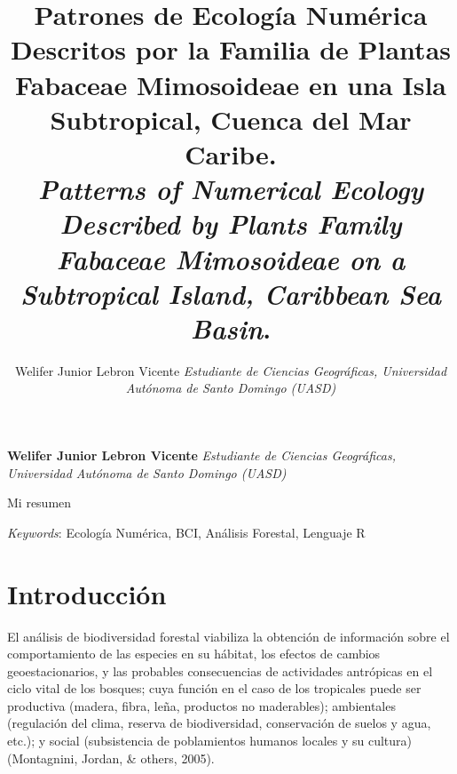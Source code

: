 \documentclass[11pt,]{article}
\title{Patrones de Ecología Numérica Descritos por la Familia de Plantas
Fabaceae Mimosoideae en una Isla Subtropical, Cuenca del Mar Caribe.\\
\emph{Patterns of Numerical Ecology Described by Plants Family Fabaceae
Mimosoideae on a Subtropical Island, Caribbean Sea Basin}.\\  }
\author{\Large Welifer Junior Lebron Vicente\vspace{0.05in} \newline\normalsize\emph{Estudiante de Ciencias Geográficas, Universidad Autónoma de Santo
Domingo (UASD)}  }
\date{}
\newcommand*{\authorfont}{\fontfamily{phv}\selectfont}
\renewenvironment{abstract}
 {{%
    \setlength{\leftmargin}{0mm}
    \setlength{\rightmargin}{\leftmargin}%
  }%
  \relax}
 {\endlist}
\begin{document}
	
%

{%
\setlength{\parindent}{0pt}
\thispagestyle{plain}
{\fontsize{18}{20}\selectfont\raggedright 
\maketitle  %

}

{
   \vskip 13.5pt\relax \normalsize\fontsize{11}{12} 
\textbf{\authorfont Welifer Junior Lebron Vicente} \hskip 15pt \emph{\small Estudiante de Ciencias Geográficas, Universidad Autónoma de Santo
Domingo (UASD)}   

}

}








\begin{abstract}

    \hbox{\vrule height .2pt width 39.14pc}

    \vskip 8.5pt %

\noindent Mi resumen


\vskip 8.5pt \noindent \emph{Keywords}: Ecología Numérica, BCI, Análisis Forestal, Lenguaje R \par

    \hbox{\vrule height .2pt width 39.14pc}



\end{abstract}


\vskip 6.5pt


\noindent  \section{Introducción}\label{introducciuxf3n}

El análisis de biodiversidad forestal viabiliza la obtención de
información sobre el comportamiento de las especies en su hábitat, los
efectos de cambios geoestacionarios, y las probables consecuencias de
actividades antrópicas en el ciclo vital de los bosques; cuya función en
el caso de los tropicales puede ser productiva (madera, fibra, leña,
productos no maderables); ambientales (regulación del clima, reserva de
biodiversidad, conservación de suelos y agua, etc.); y social
(subsistencia de poblamientos humanos locales y su cultura) (Montagnini,
Jordan, \& others, 2005).
\end{document}

